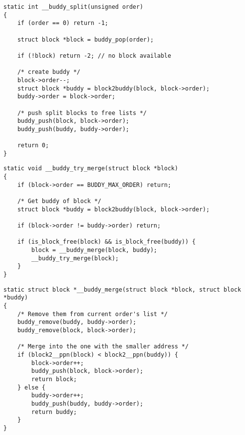 \newpar{}
\begin{lstlisting}[style=bright_C++]
static int __buddy_split(unsigned order)
{
    if (order == 0) return -1;

    struct block *block = buddy_pop(order);

    if (!block) return -2; // no block available

    /* create buddy */
    block->order--;
    struct block *buddy = block2buddy(block, block->order);
    buddy->order = block->order;

    /* push split blocks to free lists */
    buddy_push(block, block->order);
    buddy_push(buddy, buddy->order);

    return 0;
}
\end{lstlisting}

\newpar{}
\begin{lstlisting}[style=bright_C++]
static void __buddy_try_merge(struct block *block)
{
    if (block->order == BUDDY_MAX_ORDER) return;

    /* Get buddy of block */
    struct block *buddy = block2buddy(block, block->order);

    if (block->order != buddy->order) return;

    if (is_block_free(block) && is_block_free(buddy)) {
        block = __buddy_merge(block, buddy);
        __buddy_try_merge(block);
    }
}
\end{lstlisting}
\newpar{}
\begin{lstlisting}[style=bright_C++]
static struct block *__buddy_merge(struct block *block, struct block *buddy)
{
    /* Remove them from current order's list */
    buddy_remove(buddy, buddy->order);
    buddy_remove(block, block->order);

    /* Merge into the one with the smaller address */
    if (block2__ppn(block) < block2__ppn(buddy)) {
        block->order++;
        buddy_push(block, block->order);
        return block;
    } else {
        buddy->order++;
        buddy_push(buddy, buddy->order);
        return buddy;
    }
}
\end{lstlisting}



